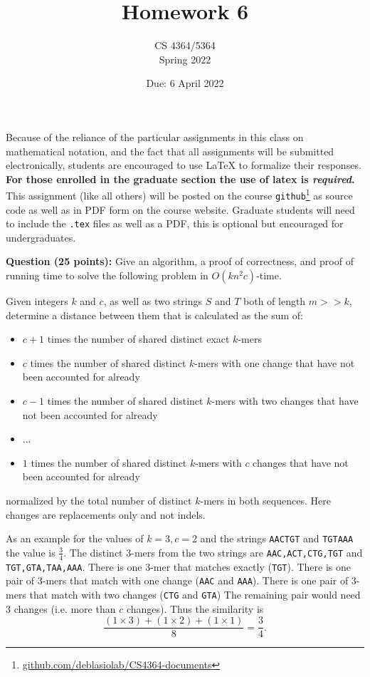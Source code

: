 \documentclass[11pt, oneside]{article}   	%
\title{Homework 6}
\author{CS 4364/5364\\Spring 2022}
\date{Due: 6 April 2022}							%
\begin{document}
\maketitle

Because of the reliance of the particular assignments in this class on mathematical notation, 
and the fact that all assignments will be submitted electronically, 
students are encouraged to use \LaTeX{} to formalize their responses. 
\textbf{For those enrolled in the graduate section the use of latex is \emph{required}.}
This assignment (like all others) will be posted on the course \texttt{github}\footnote{\url{github.com/deblasiolab/CS4364-documents}} as source code as well as in PDF form on the course website. 
Graduate students will need to include the \texttt{.tex} files as well as a PDF, this is optional but encouraged for undergraduates. 

\textbf{Question (25 points):} 
Give an algorithm, a proof of correctness, and proof of running time to solve the following problem in $O(kn^2c)$-time.

Given integers $k$ and $c$, as well as two strings $S$ and $T$ both of length $m >> k$, determine a distance between them that is calculated as the sum of: 
\begin{itemize}
\item $c+1$ times the number of shared distinct exact $k$-mers
\item $c$ times the number of shared distinct $k$-mers with one change that have not been accounted for already
\item $c-1$ times the number of shared distinct $k$-mers with two changes that have not been accounted for already
\item ...
\item $1$ times the number of shared distinct $k$-mers with $c$ changes that have not been accounted for already
\end{itemize}
normalized by the total number of distinct $k$-mers in both sequences.
Here changes are replacements only and not indels. 

As an example for the values of $k=3, c=2$ and the strings \texttt{AACTGT} and \texttt{TGTAAA} the value is  $\frac{3}{4}$. 
The distinct $3$-mers from the two strings are \texttt{AAC,ACT,CTG,TGT} and \texttt{TGT,GTA,TAA,AAA}.
There is one $3$-mer that matches exactly (\texttt{TGT}).
There is one pair of $3$-mers that match with one change (\texttt{AAC} and \texttt{AAA}).
There is one pair of $3$-mers that match with two changes (\texttt{CTG} and \texttt{GTA})
The remaining pair would need 3 changes (i.e. more than $c$ changes). 
Thus the similarity is 
\[
\frac{(1\times 3) + (1 \times 2) + (1 \times 1)}{8} = \frac{3}{4}.
\]
\end{document}
